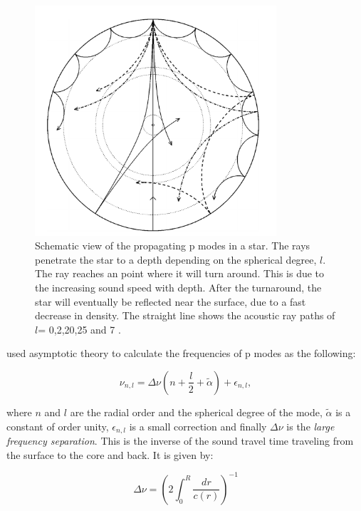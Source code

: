 \begin{figure}[t]
    \centering
    \includegraphics[width=0.8\textwidth]{propagationrays.png}
    \caption{Schematic view of the propagating p modes in a star. The rays penetrate the star to a depth depending  on the spherical degree, $l$. The ray reaches an point where it will turn around. This is due to the increasing sound speed with depth. After the turnaround, the star will eventually be reflected near the surface, due to a fast decrease in density. The straight line shows the acoustic ray paths of $l$= 0,2,20,25 and 7 \citep{aerts2010}.}
    \label{rays}
\end{figure}

\citep{shibahashi1979modal} used asymptotic theory to calculate the frequencies of p modes as the following: 

\begin{equation}
    \nu_{n,l} = \Delta\nu\left(n+\frac{l}{2}+\widetilde{\alpha}\right) + \epsilon_{n,l},
\end{equation}

\noindent where $n$ and $l$ are the radial order and the spherical degree of the mode, $\widetilde{\alpha}$ is a constant of order unity, $\epsilon_{n,l}$ is a small correction and finally $\Delta\nu$ is the \textit{large frequency separation}. This is the inverse of the sound travel time traveling from the surface to the core and back. It is given by: 

\begin{equation}
\label{deltanu}
    \Delta\nu = \left( 2\int_{0}^{R}\frac{dr}{c(r)}\right)^{-1}
\end{equation}

